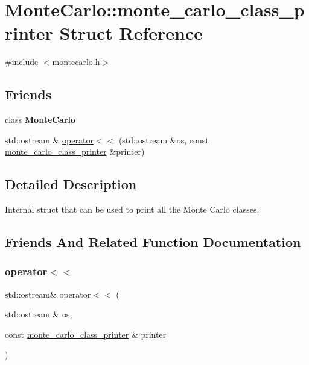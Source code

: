 \hypertarget{structMonteCarlo_1_1monte__carlo__class__printer}{}\section{Monte\+Carlo\+:\+:monte\+\_\+carlo\+\_\+class\+\_\+printer Struct Reference}
\label{structMonteCarlo_1_1monte__carlo__class__printer}


{\ttfamily \#include $<$montecarlo.\+h$>$}

\subsection*{Friends}
\begin{DoxyCompactItemize}
\item 
\mbox{\label{structMonteCarlo_1_1monte__carlo__class__printer_ab7b18723975f1e1e5b3e648723592fa0}} 
class {\bfseries Monte\+Carlo}
\item 
std\+::ostream \& \hyperlink{structMonteCarlo_1_1monte__carlo__class__printer_a7886078cc8c754337737f8951c3b2431}{operator$<$$<$} (std\+::ostream \&os, const \hyperlink{structMonteCarlo_1_1monte__carlo__class__printer}{monte\+\_\+carlo\+\_\+class\+\_\+printer} \&printer)
\end{DoxyCompactItemize}


\subsection{Detailed Description}
Internal struct that can be used to print all the Monte Carlo classes. 

\subsection{Friends And Related Function Documentation}
\mbox{\label{structMonteCarlo_1_1monte__carlo__class__printer_a7886078cc8c754337737f8951c3b2431}} 
\subsubsection{\texorpdfstring{operator$<$$<$}{operator<<}}
{\footnotesize\ttfamily std\+::ostream\& operator$<$$<$ (\begin{DoxyParamCaption}\item[{std\+::ostream \&}]{os,  }\item[{const \hyperlink{structMonteCarlo_1_1monte__carlo__class__printer}{monte\+\_\+carlo\+\_\+class\+\_\+printer} \&}]{printer }\end{DoxyParamCaption})\hspace{0.3cm}{\ttfamily [friend]}}

